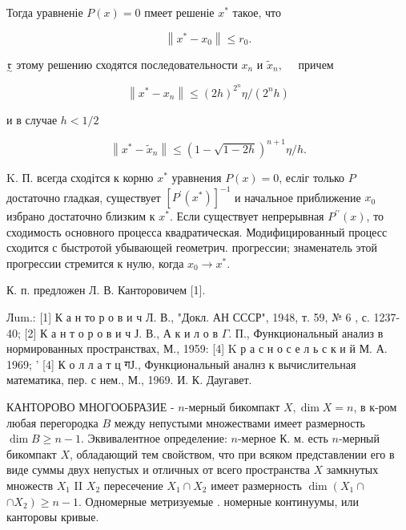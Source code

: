 \documentclass[10pt]{article}
\begin{document}
Тогда уравненіе $P(x)=0$ пмеет решеніе $x^{*}$ такое, что



\[

\left\|x^{*}-x_{0}\right\| \leqslant r_{0} .

\]



$\underset{\sim}{\mathfrak{r}}$ этому решению сходятся последовательности $x_{n}$ и $\tilde{x}_{n}, \quad$ причем



\[

\left\|x^{*}-x_{n}\right\| \leqslant(2 h)^{2^{n}} \eta /\left(2^{n} h\right)

\]



и в случае $h<1 / 2$



\[

\left\|x^{*}-\tilde{x}_{n}\right\| \leqslant(1-\sqrt{1-2 h})^{n+1} \eta / h .

\]



K. П. всегда сходітся к корню $x^{*}$ уравнения $P(x)=0$, есліг только $P$ достаточно гладкая, существует $\left[P^{\prime}\left(x^{*}\right)\right]^{-1}$ и начальное приближение $x_{0}$ избрано достаточно близким к $x^{*}$. Если существует непрерывная $P^{\prime \prime}(x)$, то сходимость основного процесса квадратическая. Модифицированный процесс сходится с быстротой убывающей геометрич. прогрессии; знаменатель этой прогрессии стремится к нулю, когда $x_{0} \rightarrow x^{*}$.



К. п. предложен Л. В. Канторовичем [1].



Лum.: [1] К а н то р о в и ч Л. В., "Докл. АН СССР", 1948, т. 59, № 6 , с. 1237-40; [2] К а н т о р о в и ч Ј. В., А к и л о в $\Gamma$. П., Функциональный анализ в нормированных пространствах, М., 1959: [4] K р а с н о с е л ь с к и й М. А. 1969; ' [4] К о л л а т ц गЈ., Функциональный аналнз к вычислительная математика, пер. с нем., М., 1969. И. К. Даугавет.



КАНТОРОВО МНОГООБРАЗИЕ - $n$-мерный бикомпакт $X, \operatorname{dim} X=n$, в к-ром любая перегородка $B$ между непустыми множествами имеет размерность $\operatorname{dim} B \geqslant n-1$. Эквивалентное определение: $n$-мерное К. м. есть $n$-мерный бикомпакт $X$, обладающий тем свойством, что при всяком представлении его в виде суммы двух непустых и отличных от всего пространства $X$ замкнутых множеств $X_{1}$ II $X_{2}$ пересечение $X_{1} \cap X_{2}$ имеет размерность $\operatorname{dim}\left(X_{1} \cap\right.$ $\left.\cap X_{2}\right) \geqslant n-1$. Одномерные метризуемые . номерные континуумы, или канторовы кривые.
\end{document}
